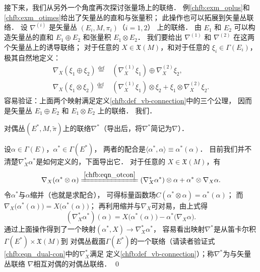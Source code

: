 接下来，我们从另外一个角度再次探讨张量场上的联络．
例\ref{chfb:exm_oplus}和\ref{chfb:exm_otimes}给出了矢量丛的直和与张量积；
此操作也可以拓展到矢量丛联络．
设 $\nabla^{(i)}$ 是矢量丛 $(E_i, M,\pi_i)$（$i=1,2$） 上的联络． 
由 $E_1$ 和 $E_2$ 可以构造矢量丛的直和 $E_1 \oplus E_2$ 和张量积 $E_1 \otimes E_2$．
我们要给出 $\nabla^{(1)}$ 和 $\nabla^{(2)}$ 在这两个矢量丛上的诱导联络；
对于任意的 $X \in \mathfrak{X}(M)$，和对于任意的 $\xi_i \in \Gamma(E_i)$，
极其自然地定义：
\begin{align}
    \nabla_X\left(\xi_1 \oplus \xi_2\right)\overset{\mathrm {def}}{=}&
    \left(\nabla_X^{(1)} \xi_1\right) \oplus \nabla_X^{(2)} \xi_2, \label{chfb:eqn_opcon} \\
    \nabla_X\left(\xi_1 \otimes \xi_2\right)\overset{\mathrm {def}}{=}& \left(\nabla_X^{(1)} \xi_1\right) \otimes 
    \xi_2+\xi_1 \otimes \nabla_X^{(2)} \xi_2 . \label{chfb:eqn_otcon}
\end{align}
容易验证：上面两个映射满足定义\ref{chfb:def_vb-connection}中的三个公理，
因而是矢量丛 $E_1 \oplus E_2$ 和 $E_1 \otimes E_2$ 上的联络．
我们．


\begin{example}
    对偶丛$(E^*,M,\tilde{\pi})$上的联络$\nabla^*$（导出后，将$\nabla^*$简记为$\nabla$）．
\end{example}
设$\alpha \in \Gamma(E)$，$\alpha^*\in \Gamma(E^*)$，
两者的配合是$\langle \alpha^*, \alpha \rangle \equiv \alpha^*(\alpha)$．
目前我们并不清楚$\nabla_X^* \alpha^*$是如何定义的，下面导出它．
对于任意的 $X \in \mathfrak{X}(M)$，有
\begin{equation*}
    \nabla_X( \alpha^* \otimes \alpha )\xlongequal{\ref{chfb:eqn_otcon}}
    (\nabla_X^* \alpha^*)\otimes \alpha + \alpha^* \otimes \nabla_X \alpha .
\end{equation*}
令$\alpha^*$与$\alpha$缩并（也就是求配合），
可得标量函数场$C(\alpha^* \otimes \alpha)=\alpha^*(\alpha)$；
而$\nabla_X\bigl( \alpha^*(\alpha) \bigr)=X \bigl( \alpha^*(\alpha) \bigr)$；
再利用缩并与$\nabla_X$可对易，由上式得
\begin{equation}\label{chfb:eqn_dual-con}
    (\nabla_X^* \alpha^* )(\alpha)=X\bigl(\alpha^*(\alpha)\bigr)-\alpha^*\bigl(\nabla_X \alpha\bigr).
\end{equation}
通过上面操作得到了一个映射$(\alpha^*, X) \to \nabla_X^* \alpha^*$，
容易看出映射$\nabla^*$是从笛卡尔积$\Gamma(E^*)\times \mathfrak{X}(M)$到
对偶丛截面$\Gamma (E^*)$的一个联络（请读者验证式\eqref{chfb:eqn_dual-con}中的$\nabla_X^*$满足
定义\ref{chfb:def_vb-connection}）；称$\nabla^*$为与矢量丛联络 $\nabla$相互对偶的对偶丛联络．
\qed


